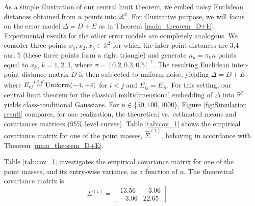 As a simple illustration of our central limit theorem, we embed noisy Euclidean
distances obtained from $n$ points into ${\mathbb R}^2$. For illustrative purpose, we will focus on the error model $\Delta = D
+ E$ as in Theorem
\ref{main_theorem_D+E}. Experimental results for the other error
models are completely analogous. We consider three
points $x_1,x_2,x_3 \in \mathbb{R}^2$ for which the inter-point
distances are 3,4 and 5 (these three points form a right triangle) and
generate $n_k = \pi_k n$ points equal to $x_k$, $k=1,2,3$, where $\pi
= [0.2,0.3,0.5]^\top$.  The resulting Euclidean inter-point distance
matrix $D$ is then subjected to uniform noise, yielding $\Delta = D+E$
where $E_{ij} {\stackrel{i.i.d.}{\sim}} \textrm{Uniform}(-4,+4)$ for $i<j$ and
$E_{ij}=E_{ji}$.  For this setting, our central limit theorem for the classical multidimensional embedding of $\Delta$ into $\mathbb{R}^{2}$ yields class-conditional Gaussians.  For $n \in \{50,
100, 1000\}$, Figure \ref{fig:Simulation result} compares, for
one realization, the theoretical vs.\ estimated means and covariances
matrices (95\% level curves).  Table \ref{tab:cov_1} shows the
empirical covariance matrix for one of the point masses,
$\hat{\Sigma}^{(1)}$, behaving in accordance with Theorem
\ref{main_theorem_D+E}. %

Table \ref{tab:cov_1} investigates the empirical covariance matrix for
one of the point masses, and its entry-wise variance, as a function of
$n$. The theoretical covariance matrix is $$\Sigma^{(1)}
= \begin{bmatrix} 13.56 & -3.06 \\ -3.06 & 22.65 \end{bmatrix}$$

